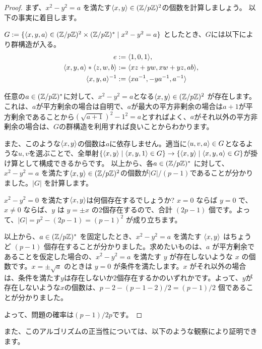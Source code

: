 \documentclass{jsarticle}
\begin{document}
  \begin{proof}
   まず、$x^2 - y^2 = a$ を満たす$\langle{x, y}\rangle \in (\mathbb{Z}/p\mathbb{Z})^2$の個数を計算しましょう。
   以下の事実に着目します。
   \begin{center}
    $G := \{\langle{x, y, a}\rangle \in (\mathbb{Z}/p\mathbb{Z})^2 \times (\mathbb{Z}/p\mathbb{Z})^* \mid x^2 - y^2 = a \}$ としたとき、$G$には以下により群構造が入る。
    \begin{align*}
     e &:= \langle{1, 0, 1}\rangle,\\
     \langle{x, y, a}\rangle * \langle{z, w, b}\rangle &:= \langle{xz + yw, xw+yz, ab}\rangle,\\
     \langle{x, y, a}\rangle^{-1} &:= \langle{xa^{-1}, -ya^{-1}, a^{-1}}\rangle
    \end{align*}
   \end{center}
   任意の$a \in (\mathbb{Z}/p\mathbb{Z})^*$に対して、$x^2-y^2=a$となる$\langle{x,y}\rangle\in (\mathbb{Z}/p\mathbb{Z})^2$ が存在します。これは、$a$が平方剰余の場合は自明で、$a$が最大の平方非剰余の場合は$a+1$が平方剰余であることから$(\sqrt{a+1})^2-1^2=a$とすればよく、$a$がそれ以外の平方非剰余の場合は、$G$の群構造を利用すれば良いことからわかります。

   また、このような$\langle{x,y}\rangle$の個数は$a$に依存しません。適当に$\langle{u,v,a}\rangle\in G$となるような$u,v$を選ぶことで、全単射$\{\langle{x, y}\rangle \mid \langle{x,y,1}\rangle \in G \} \to \{\langle{x, y}\rangle \mid \langle{x, y, a}\rangle \in G\}$が掛け算として構成できるからです。
   以上から、各$a \in (\mathbb{Z}/p\mathbb{Z})^*$ に対して、$x^2 - y^2 = a$ を満たす$\langle{x,y}\rangle \in (\mathbb{Z}/p\mathbb{Z})^2$の個数が$|G|/(p-1)$であることが分かりました。$|G|$ を計算します。

   $x^2-y^2 = 0$ を満たす$\langle{x,y}\rangle$は何個存在するでしょうか? $x = 0$ ならば $y = 0$ で、
   $x \neq 0$ ならば、$y$ は $y = \pm x$ の2個存在するので、合計 $(2p-1)$ 個です。よって、$|G| = p^2 - (2p - 1) = (p - 1)^2$ が成り立ちます。

   以上から、$a \in (\mathbb{Z}/p\mathbb{Z})^*$ を固定したとき、$x^2-y^2=a$ を満たす $\langle{x,y}\rangle$ はちょうど $(p - 1)$ 個存在することが分かりました。求めたいものは、$a$ が平方剰余であることを仮定した場合の、$x^2-y^2=a$ を満たす $y$ が存在しないような $x$ の個数です。$x = \pm \sqrt{a}$ のときは $y = 0$ が条件を満たします。$x$ がそれ以外の場合は、条件を満たす$y$は存在しないか2個存在するかのいずれかです。よって、$y$が存在しないような$x$の個数は、$p - 2 - (p - 1 - 2)/2 = (p - 1)/2$ 個であることが分かりました。

   よって、問題の確率は$(p-1)/2p$です。
  \end{proof}
  また、このアルゴリズムの正当性については、以下のような観察により証明できます。
\end{document}
